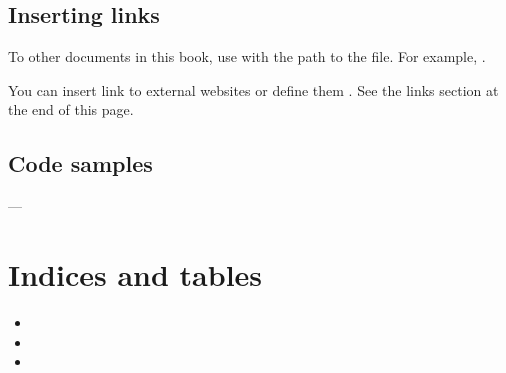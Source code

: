 \documentclass[letterpaper,10pt,english]{sphinxmanual}
\begin{document}
\section{Inserting links}
\label{\detokenize{sample-chapter:inserting-links}}
\sphinxAtStartPar
To other documents in this book, use  with the
path to the file. For example, {\hyperref[\detokenize{index::doc}]{}}.

\sphinxAtStartPar
You can insert link to external websites
 or
define them .
See the links section at the end of this page.


\section{Code samples}
\label{\detokenize{sample-chapter:code-samples}}
\begin{sphinxVerbatim}[commandchars=\\\{\}]
   
\end{sphinxVerbatim}

\sphinxAtStartPar
—


\chapter{Indices and tables}
\label{\detokenize{index:indices-and-tables}}\begin{itemize}
\item {} 
\sphinxAtStartPar
{}

\item {} 
\sphinxAtStartPar
{}

\item {} 
\sphinxAtStartPar
{}

\end{itemize}



\renewcommand{\indexname}{Index}
\printindex
\end{document}
